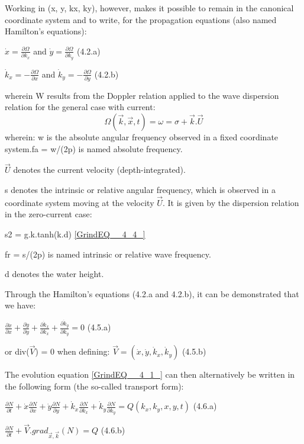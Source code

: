  Working in (x, y, kx, ky), however, makes it possible to remain in the canonical coordinate system and to write, for the propagation equations (also named Hamilton's equations):

$\dot{x}=\frac{\partial \Omega }{\partial k_{x} } $ and $\dot{y}=\frac{\partial \Omega }{\partial k_{y} } $ (4.2.a)

 $\dot{k}_{x} =-\frac{\partial \Omega }{\partial x} $ and $\dot{k}_{y} =-\frac{\partial \Omega }{\partial y} $ (4.2.b)

 wherein W results from the Doppler relation applied to the wave dispersion relation for the general case with current:
\begin{equation} \label{GrindEQ__4_3_}
\Omega (\vec{k},\vec{x},t)=\omega =\sigma +\vec{k}.\vec{U}
\end{equation}
wherein:  w is the absolute angular frequency observed in a fixed coordinate system.fa = w/(2p) is named absolute frequency.

 $\vec{U}$ denotes the current velocity (depth-integrated).

 s denotes the intrinsic or relative angular frequency, which is observed in a coordinate system moving at the velocity $\vec{U}$. It is given by the dispersion relation in the zero-current case:

    s2 = g.k.tanh(k.d) \eqref{GrindEQ__4_4_}

 fr = s/(2p) is named intrinsic or relative wave frequency.

 d denotes the water height.

 Through the Hamilton's equations (4.2.a and 4.2.b), it can be demonstrated that we have:

$\frac{\partial \dot{x}}{\partial x} +\frac{\partial \dot{y}}{\partial y} +\frac{\partial \dot{k}_{x} }{\partial k_{x} } +\frac{\partial \dot{k}_{y} }{\partial k_{y} } =0$  (4.5.a)

or  div($\vec{V}$) = 0   when defining: $\vec{V}=(\dot{x},\dot{y},\dot{k}_{x} ,\dot{k}_{y} )$ (4.5.b)

 The evolution equation \eqref{GrindEQ__4_1_} can then alternatively be written in the following form (the so-called transport form):

$\frac{\partial N}{\partial t} +\dot{x}\frac{\partial N}{\partial x} +\dot{y}\frac{\partial N}{\partial y} +\dot{k}_{x} \frac{\partial N}{\partial k_{x} } +\dot{k}_{y} \frac{\partial N}{\partial k_{y} } =Q(k_{x} ,k_{y} ,x,y,t)$ (4.6.a)

$\frac{\partial N}{\partial t} +\vec{V}.grad_{\vec{x},\vec{k}} (N)=Q$ (4.6.b)

